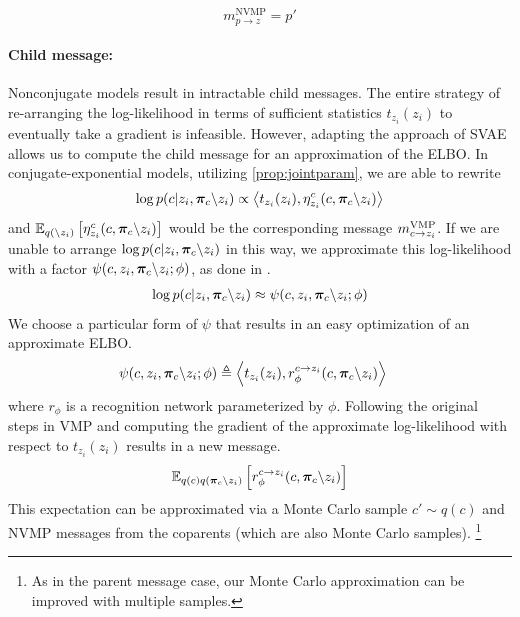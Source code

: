 \begin{equation}
    m^{\text{NVMP}}_{p \rightarrow z} = p'
\end{equation}

\paragraph{Child message:}
Nonconjugate models result in intractable child messages.
The entire strategy of re-arranging
the log-likelihood
in terms of sufficient statistics $t_{z_i}(z_i)$ to eventually
take a gradient is infeasible.
However, adapting the approach of SVAE allows us to
compute the child message for an approximation of the ELBO.
In conjugate-exponential models, utilizing \autoref{prop:jointparam},
we are able to rewrite
\begin{equation}
\log p(c | z_i, \bm{\pi}_c \backslash z_i) \propto \left\langle t_{z_i}(z_i), \eta_{z_i}^c(c, \bm{\pi}_c \backslash z_i)\right\rangle 
\end{equation}
and $\mathbb{E}_{q(\backslash z_i)}\left[\eta_{z_i}^c(c, \bm{\pi}_c \backslash z_i)\right]$
would be the corresponding message $m^{\text{VMP}}_{c \rightarrow z_i}$.
If we are unable to arrange $\log p(c | z_i, \bm{\pi}_c \backslash z_i)$ in this way, we approximate this log-likelihood with a factor $\psi(c, z_i, \bm{\pi}_{c} \backslash z_i; \phi)$, as done in \cite{svae}.
\begin{equation}
\label{eq:rectrick}
\begin{split}
\log p(c | z_i, \bm{\pi}_c \backslash z_i) &\approx \psi(c, z_i, \bm{\pi}_{c} \backslash z_i; \phi) \\
\end{split}
\end{equation}
We choose a particular form of $\psi$ that results in an easy optimization
of an approximate ELBO.
\begin{equation}
\begin{split}
    \psi(c, z_i, \bm{\pi}_{c} \backslash z_i; \phi) &\triangleq \left\langle t_{z_i}(z_i), r^{c \rightarrow z_i}_{\phi}(c, \bm{\pi}_{c} \backslash z_i)\right\rangle
\end{split}
\end{equation}
where $r_{\phi}$ is a recognition network parameterized by $\phi$.
Following the original steps in VMP
and computing the gradient of the approximate log-likelihood
with respect to $t_{z_i}(z_i)$ results in a new message.
\begin{equation}
    \mathbb{E}_{q(c)q(\bm{\pi}_c \backslash z_i)} \left[r^{c \rightarrow z_i}_{\phi}(c, \bm{\pi}_{c}\backslash z_i)\right]
\end{equation}
This expectation can be approximated via a Monte Carlo sample $c' \sim q(c)$
and NVMP messages from the coparents (which are also Monte Carlo samples).
\footnote{As in the parent message case, our Monte Carlo approximation can
be improved with multiple samples.}

